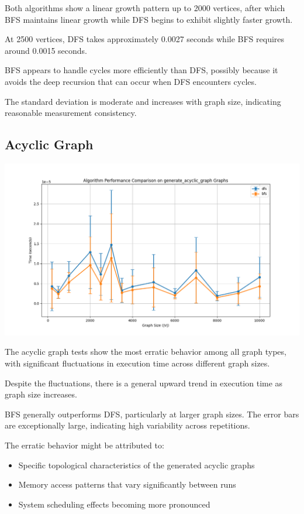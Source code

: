 \documentclass[a4paper,12pt]{article}
\begin{document}
Both algorithms show a linear growth pattern up to 2000 vertices, after which BFS maintains linear growth while DFS begins to exhibit slightly faster growth.

At 2500 vertices, DFS takes approximately 0.0027 seconds while BFS requires around 0.0015 seconds.

BFS appears to handle cycles more efficiently than DFS, possibly because it avoids the deep recursion that can occur when DFS encounters cycles.

The standard deviation is moderate and increases with graph size, indicating reasonable measurement consistency.
\subsection{Acyclic Graph}
\label{sec:org4e7515a}
\begin{center}
\includegraphics[width=.9\linewidth]{dfs_acyclic.png}
\label{org676f13e}
\end{center}

The acyclic graph tests show the most erratic behavior among all graph types, with significant fluctuations in execution time across different graph sizes.

Despite the fluctuations, there is a general upward trend in execution time as graph size increases.

BFS generally outperforms DFS, particularly at larger graph sizes.
The error bars are exceptionally large, indicating high variability across repetitions.

The erratic behavior might be attributed to:
\begin{itemize}
\item Specific topological characteristics of the generated acyclic graphs
\item Memory access patterns that vary significantly between runs
\item System scheduling effects becoming more pronounced
\end{itemize}
\end{document}
